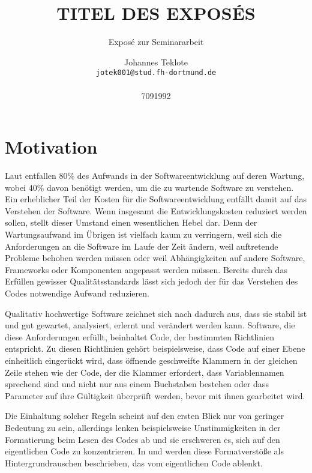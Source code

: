 \documentclass[fontsize=11pt, paper=a4, parskip=half]{scrartcl}
\title{
	TITEL DES EXPOSÉS
}
\subtitle{Exposé zur Seminararbeit}
\author{
	Johannes Teklote
	\\
	\texttt{jotek001@stud.fh-dortmund.de}
	\\ \\
	{7091992}
}
\begin{document}
\maketitle

\section{Motivation}
Laut \cite{Balzert2009} entfallen 80\% des Aufwands in der Softwareentwicklung auf deren Wartung, wobei 40\% davon benötigt werden, um die zu wartende Software zu verstehen.
Ein erheblicher Teil der Kosten für die Softwareentwicklung entfällt damit auf das Verstehen der Software.
Wenn insgesamt die Entwicklungskosten reduziert werden sollen, stellt dieser Umstand einen wesentlichen Hebel dar.
Denn der Wartungsaufwand im Übrigen ist vielfach kaum zu verringern, weil sich die Anforderungen an die Software im Laufe der Zeit ändern, weil auftretende Probleme behoben werden müssen oder weil Abhängigkeiten auf andere Software, Frameworks oder Komponenten angepasst werden müssen.
Bereits durch das Erfüllen gewisser Qualitätsstandards lässt sich jedoch der für das Verstehen des Codes notwendige Aufwand reduzieren.

Qualitativ hochwertige Software zeichnet sich nach \cite{ISO-25010} dadurch aus, dass sie stabil ist und gut gewartet, analysiert, erlernt und verändert werden kann.
Software, die diese Anforderungen erfüllt, beinhaltet Code, der bestimmten Richtlinien entspricht.
Zu diesen Richtlinien gehört beispielsweise, dass Code auf einer Ebene einheitlich eingerückt wird, dass öffnende geschweifte Klammern in der gleichen Zeile stehen wie der Code, der die Klammer erfordert, dass Variablennamen sprechend sind und nicht nur aus einem Buchstaben bestehen oder dass Parameter auf ihre Gültigkeit überprüft werden, bevor mit ihnen gearbeitet wird.

Die Einhaltung solcher Regeln scheint auf den ersten Blick nur von geringer Bedeutung zu sein, allerdings lenken beispielsweise Unstimmigkeiten in der Formatierung beim Lesen des Codes ab und sie erschweren es, sich auf den eigentlichen Code zu konzentrieren.
In \cite{PJ2015} und \cite{SP2011} werden diese Formatverstöße als Hintergrundrauschen beschrieben, das vom eigentlichen Code ablenkt. 
\end{document}
